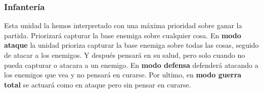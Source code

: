 \subsubsection{Infantería}
Esta unidad la hemos interpretado con una máxima prioridad sobre ganar la partida. Priorizará capturar la base enemiga sobre cualquier cosa. En \textbf{modo ataque} la unidad prioriza capturar la base enemiga sobre todas las cosas, seguido de atacar a los enemigos. Y después pensará en su salud, pero solo cuando no pueda capturar o atacara a un enemigo. En\textbf{ modo defensa} defenderá atacando a los enemigos que vea y no pensará en curarse. Por ultimo, en \textbf{modo guerra total} se actuará como en ataque pero sin pensar en curarse.

\begin{figure}[H]
    \centering
\end{figure}
